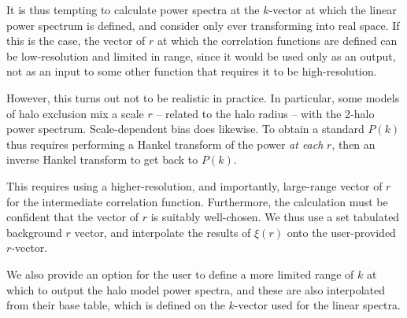 \documentclass[5p,aas_macros]{elsarticle}
\begin{document}
It is thus tempting to calculate power spectra at the $k$-vector at which the linear power spectrum is defined, and consider only ever transforming into real space. If this is the case, the vector of $r$ at which the correlation functions are defined can be low-resolution and limited in range, since it would be used only as an output, not as an input to some other function that requires it to be high-resolution.

However, this turns out not to be realistic in practice. 
In particular, some models of halo exclusion mix a scale $r$ -- related to the halo radius -- with the 2-halo power spectrum. Scale-dependent bias does likewise. To obtain a standard $P(k)$ thus requires performing a Hankel transform of the power \textit{at each} $r$, then an inverse Hankel transform to get back to $P(k)$. 

This requires using a higher-resolution, and importantly, large-range vector of $r$ for the intermediate correlation function. Furthermore, the calculation must be confident that the vector of $r$ is suitably well-chosen. We thus use a set tabulated background $r$ vector, and interpolate the results of $\xi(r)$ onto the user-provided $r$-vector. 

We also provide an option for the user to define a more limited range of $k$ at which to output the halo model power spectra, and these are also interpolated from their base table, which is defined on the $k$-vector used for the linear spectra. 
\end{document}
